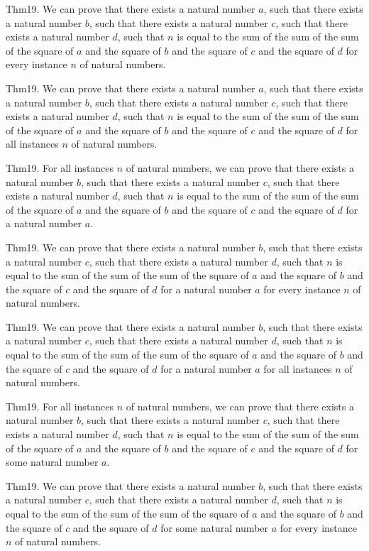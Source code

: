 \documentclass{article}
\begin{document}
Thm19. We can prove that there exists a natural number $a$, such that there exists a natural number $b$, such that there exists a natural number $c$, such that there exists a natural number $d$, such that $n$ is equal to the sum of the sum of the sum of the square of $a$ and the square of $b$ and the square of $c$ and the square of $d$ for every instance $n$ of natural numbers.

Thm19. We can prove that there exists a natural number $a$, such that there exists a natural number $b$, such that there exists a natural number $c$, such that there exists a natural number $d$, such that $n$ is equal to the sum of the sum of the sum of the square of $a$ and the square of $b$ and the square of $c$ and the square of $d$ for all instances $n$ of natural numbers.

Thm19. For all instances $n$ of natural numbers, we can prove that there exists a natural number $b$, such that there exists a natural number $c$, such that there exists a natural number $d$, such that $n$ is equal to the sum of the sum of the sum of the square of $a$ and the square of $b$ and the square of $c$ and the square of $d$ for a natural number $a$.

Thm19. We can prove that there exists a natural number $b$, such that there exists a natural number $c$, such that there exists a natural number $d$, such that $n$ is equal to the sum of the sum of the sum of the square of $a$ and the square of $b$ and the square of $c$ and the square of $d$ for a natural number $a$ for every instance $n$ of natural numbers.

Thm19. We can prove that there exists a natural number $b$, such that there exists a natural number $c$, such that there exists a natural number $d$, such that $n$ is equal to the sum of the sum of the sum of the square of $a$ and the square of $b$ and the square of $c$ and the square of $d$ for a natural number $a$ for all instances $n$ of natural numbers.

Thm19. For all instances $n$ of natural numbers, we can prove that there exists a natural number $b$, such that there exists a natural number $c$, such that there exists a natural number $d$, such that $n$ is equal to the sum of the sum of the sum of the square of $a$ and the square of $b$ and the square of $c$ and the square of $d$ for some natural number $a$.

Thm19. We can prove that there exists a natural number $b$, such that there exists a natural number $c$, such that there exists a natural number $d$, such that $n$ is equal to the sum of the sum of the sum of the square of $a$ and the square of $b$ and the square of $c$ and the square of $d$ for some natural number $a$ for every instance $n$ of natural numbers.
\end{document}
